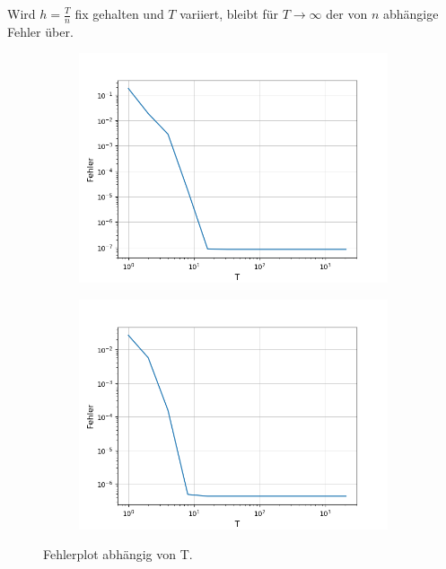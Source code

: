 \documentclass[12pt,a4paper]{scrartcl}
\numberwithin{equation}{section}
\numberwithin{myalgctr}{section}
\numberwithin{mytheoremctr}{subsection}
\numberwithin{mykorollarctr}{subsection}
\numberwithin{mylemmactr}{subsection}
\numberwithin{mybeispielctr}{subsection}
\begin{document}
	Wird $h=\frac{T}{n}$ fix gehalten und $T$ variiert, bleibt f\"ur $T\to \infty$ der von $n$ abh\"angige Fehler \"uber. 
	 	
	\begin{figure}[H]
		\begin{subfigure}[t]{0.5\textwidth}
			\includegraphics[width=\linewidth]{Fehlerplothsinx.png}
			 \label{fig:fehlerplothsinx}
		\end{subfigure}
		\begin{subfigure}[t]{0.5\textwidth}
			\includegraphics[width=\linewidth]{Fehlerplothexp.png}
			 \label{fig:fehlerplothexp}
		\end{subfigure}
		\caption{Fehlerplot abhängig von T.}
		\label{fig:fehlerploth}
	\end{figure}
	
\end{document}

